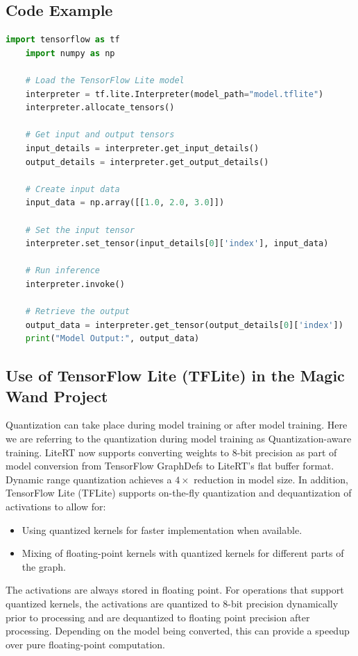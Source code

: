 \subsection{Code Example}
\begin{lstlisting}[language=Python, caption={Running Inference with a TensorFlow Lite Model in Python}, label={code:tflite-inference}, style=pythonstyle]
	import tensorflow as tf
	import numpy as np
	
	# Load the TensorFlow Lite model
	interpreter = tf.lite.Interpreter(model_path="model.tflite")
	interpreter.allocate_tensors()
	
	# Get input and output tensors
	input_details = interpreter.get_input_details()
	output_details = interpreter.get_output_details()
	
	# Create input data
	input_data = np.array([[1.0, 2.0, 3.0]])
	
	# Set the input tensor
	interpreter.set_tensor(input_details[0]['index'], input_data)
	
	# Run inference
	interpreter.invoke()
	
	# Retrieve the output
	output_data = interpreter.get_tensor(output_details[0]['index'])
	print("Model Output:", output_data)
\end{lstlisting}


\subsection{Use of TensorFlow Lite (TFLite) in the Magic Wand Project}
Quantization can take place during model training or after model training. Here we are referring to the quantization during model training as Quantization-aware training.\cite{tensorflowlite:2025}
LiteRT now supports converting weights to 8-bit precision as part of model conversion from TensorFlow GraphDefs to LiteRT's flat buffer format. Dynamic range quantization achieves a $4\times$ reduction in model size. In addition, TensorFlow Lite (TFLite) supports on-the-fly quantization and dequantization of activations to allow for:

\begin{itemize}
	\item Using quantized kernels for faster implementation when available.\cite{tensorflowlite:2025}
	\item Mixing of floating-point kernels with quantized kernels for different parts of the graph.
\end{itemize}

The activations are always stored in floating point. For operations that support quantized kernels, the activations are quantized to 8-bit precision dynamically prior to processing and are dequantized to floating point precision after processing. Depending on the model being converted, this can provide a speedup over pure floating-point computation.

